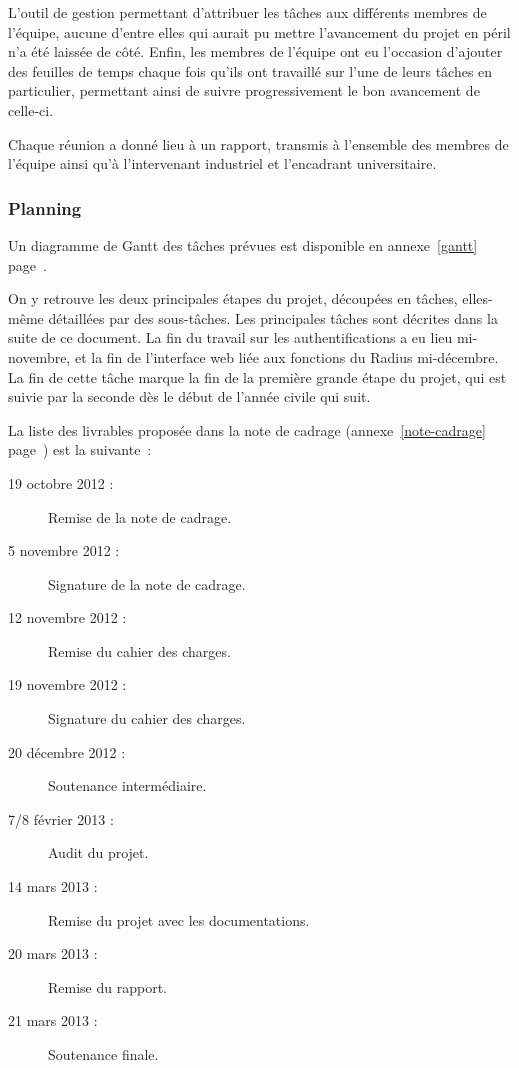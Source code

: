 L'outil de gestion permettant d'attribuer les tâches aux différents membres de l'équipe, aucune d'entre elles qui aurait pu mettre l'avancement du projet en péril n'a été laissée de côté. Enfin, les membres de l'équipe ont eu l'occasion d'ajouter des feuilles de temps chaque fois qu'ils ont travaillé sur l'une de leurs tâches en particulier, permettant ainsi de suivre progressivement le bon avancement de celle-ci.

Chaque réunion a donné lieu à un rapport, transmis à l'ensemble des membres de l'équipe ainsi qu'à l'intervenant industriel et l'encadrant universitaire.

\subsubsection{Planning}

Un diagramme de Gantt des tâches prévues est disponible en annexe~\ref{gantt} page~\pageref{gantt}.

On y retrouve les deux principales étapes du projet, découpées en tâches, elles-même détaillées par des sous-tâches. Les principales tâches sont décrites dans la suite de ce document. La fin du travail sur les authentifications a eu lieu mi-novembre, et la fin de l'interface web liée aux fonctions du Radius mi-décembre. La fin de cette tâche marque la fin de la première grande étape du projet, qui est suivie par la seconde dès le début de l'année civile qui suit.

La liste des livrables proposée dans la note de cadrage (annexe~\ref{note-cadrage} page~\pageref{note-cadrage}) est la suivante~:

\begin{description}
\item[19 octobre 2012 :] Remise de la note de cadrage.
\item[5 novembre 2012 :] Signature de la note de cadrage.
\item[12 novembre 2012 :] Remise du cahier des charges.
\item[19 novembre 2012 :] Signature du cahier des charges.
\item[20 décembre 2012 :] Soutenance intermédiaire.
\item[7/8 février 2013 :] Audit du projet.
\item[14 mars 2013 :] Remise du projet avec les documentations.
\item[20 mars 2013 :] Remise du rapport.
\item[21 mars 2013 :] Soutenance finale.
\end{description}

